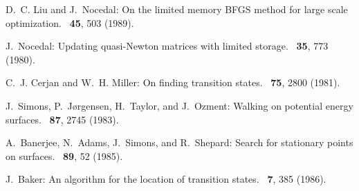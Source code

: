 \documentclass{article}
\begin{document}
\begin{thebibliography}{10}
D.~C. Liu and J.~Nocedal:
\newblock On the limited memory BFGS method for large scale optimization.
~{\bf 45}, 503  (1989).

J.~Nocedal:
\newblock Updating quasi-Newton matrices with limited storage.
~{\bf 35}, 773  (1980).

C.~J. Cerjan and W.~H. Miller:
\newblock On finding transition states.
~{\bf 75}, 2800  (1981).

J.~Simons, P.~J{\o}rgensen, H.~Taylor, and J.~Ozment:
\newblock Walking on potential energy surfaces.
~{\bf 87}, 2745  (1983).

A.~Banerjee, N.~Adams, J.~Simons, and R.~Shepard:
\newblock Search for stationary points on surfaces.
~{\bf 89}, 52  (1985).

J.~Baker:
\newblock An algorithm for the location of transition states.
~{\bf 7}, 385  (1986).

\end{thebibliography}
\end{document}

